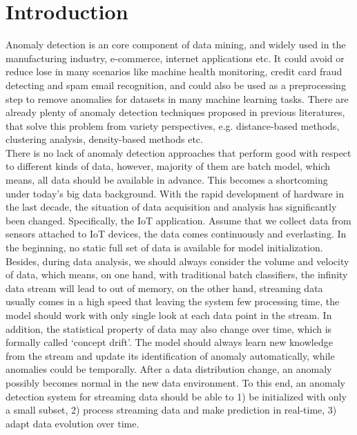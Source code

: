 \chapter{Introduction}
\label{chap:Introduction}

Anomaly detection is an core component of data mining, and widely used in the manufacturing industry, e-commerce, internet applications etc. It could avoid or reduce lose in many scenarios like machine health monitoring, credit card fraud detecting and spam email recognition, and could also be used as a preprocessing step to remove anomalies for datasets in many machine learning tasks. There are already plenty of anomaly detection techniques proposed in previous literatures, that solve this problem from variety perspectives, e.g. distance-based methods, clustering analysis, density-based methods etc.\\

There is no lack of anomaly detection approaches that perform good with respect to different kinds of data, however, majority of them are batch model, which means, all data should be available in advance. This becomes a shortcoming under today’s big data background. With the rapid development of hardware in the last decade, the situation of data acquisition and analysis has significantly been changed. Specifically, the IoT application. Assume that we collect data from sensors attached to IoT devices, the data comes continuously and everlasting. In the beginning, no static full set of data is available for model initialization. Besides, during data analysis, we should always consider the volume and velocity of data, which means, on one hand, with traditional batch classifiers, the infinity data stream will lead to out of memory, on the other hand, streaming data usually comes in a high speed that leaving the system few processing time, the model should work with only single look at each data point in the stream. In addition, the statistical property of data may also change over time, which is formally called ‘concept drift’. The model should always learn new knowledge from the stream and update its identification of anomaly automatically, while anomalies could be temporally. After a data distribution change, an anomaly possibly becomes normal in the new data environment. To this end, an anomaly detection system for streaming data should be able to 1) be initialized with only a small subset, 2) process streaming data and make prediction in real-time, 3) adapt data evolution over time.\\

